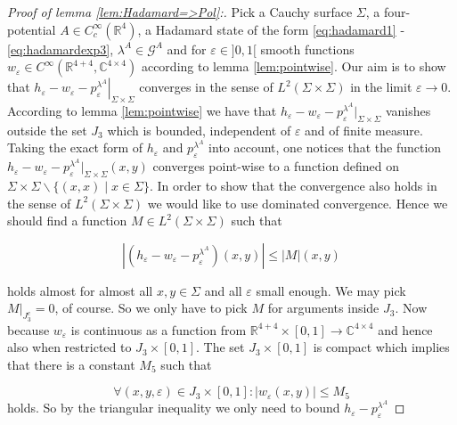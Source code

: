 \documentclass[a4paper,11pt]{article}
\begin{document}
 

\begin{proof}[Proof of lemma \ref{lem:Hadamard=>Pol}:]


Pick a Cauchy surface \(\Sigma\), a four-potential \(A \in C_c^\infty(\mathbb{R}^4)\), a Hadamard state of the form 
 \eqref{eq:hadamard1} -\eqref{eq:hadamardexp3}, \(\lambda^A\in\mathcal{G}^A\)
 and for \(\varepsilon \in]0,1[\) smooth functions \(w_\varepsilon \in C^\infty(\mathbb{R}^{4+4},\mathbb{C}^{4\times 4})\)
 according to lemma \ref{lem:pointwise}. 
Our aim is to show that 
\(\left.h_\varepsilon - w_\varepsilon -p_\varepsilon^{\lambda^A} \right|_{\Sigma\times\Sigma}\) converges in the 
sense of \(L^2(\Sigma\times\Sigma)\) in the limit \(\varepsilon\rightarrow 0\).
According to lemma \ref{lem:pointwise} we have that
 \(h_\varepsilon-w_\varepsilon-p^{\lambda^A}_{\varepsilon}|_{\Sigma\times \Sigma}\) vanishes 
 outside the set \(J_3\) which is bounded, independent of \(\varepsilon\) and of finite measure. 
 Taking the exact form of \(h_\varepsilon\) and \(p^{\lambda^A}_\varepsilon\) into account,
 one notices that the function \(h_\varepsilon-w_\varepsilon-p^{\lambda^A}_{\varepsilon}|_{\Sigma\times \Sigma} (x,y)\) converges point-wise to a function defined
 on \(\Sigma\times\Sigma \backslash \{(x,x)\mid x\in \Sigma\}\). In order to show that the convergence also holds in the sense of \(L^2(\Sigma\times\Sigma)\) we
 would like to use dominated convergence. Hence we should find a function \(M\in L^2(\Sigma\times\Sigma)\) such that 
 
 
 \begin{equation}\label{eq: def bound}
\left|  (h_\varepsilon-w_\varepsilon-p^{\lambda^A}_{\varepsilon})(x,y)\right|\le |M|(x,y)
 \end{equation}
 
 holds almost for almost all \(x,y\in\Sigma\) and all \(\varepsilon\) small enough. We may pick \(\left. M\right|_{J_3^c}=0\), of course. 
So we only have to pick \(M\) for arguments inside \(J_3\). Now because \(w_\varepsilon\) is continuous as a function from 
\(\mathbb{R}^{4+4}\times [0,1]\rightarrow \mathbb{C}^{4\times 4}\) and hence also when restricted to \(J_3\times[0,1]\). The 
set \(J_3\times[0,1]\) is compact which implies that there is a constant \(M_5\) such that

\begin{equation}
\forall (x,y,\varepsilon)\in J_3\times[0,1]: |w_\varepsilon(x,y)|\le M_5
\end{equation}
holds. So by the triangular inequality we only need to bound \(h_\varepsilon-p_\varepsilon^{\lambda^A}\)


\end{proof}
\end{document}
